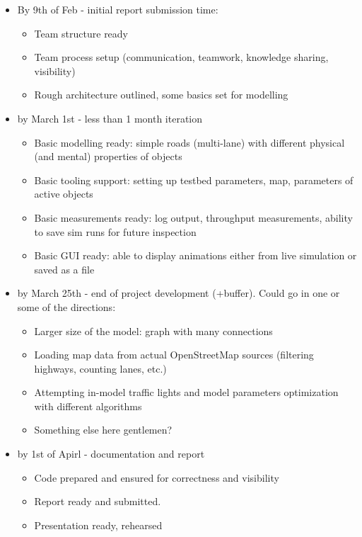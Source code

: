 \begin{itemize}
\begin{itemize}
	    \item By 9th of Feb - initial report submission time:
	    \begin{itemize}
	        \item Team structure ready
	        \item Team process setup (communication, teamwork, knowledge sharing, visibility)
	        \item Rough architecture outlined, some basics set for modelling
	    \end{itemize}

	    \item by March 1st - less than 1 month iteration
	    \begin{itemize}
	        \item Basic modelling ready: simple roads (multi-lane) with different physical (and mental) properties of objects
	        \item Basic tooling support: setting up testbed parameters, map, parameters of active objects
	        \item Basic measurements ready: log output, throughput measurements, ability to save sim runs for future inspection
	        \item Basic GUI ready: able to display animations either from live simulation or saved as a file
	    \end{itemize}

	    \item by March 25th - end of project development (+buffer). Could go in one or some of the directions:
	    \begin{itemize}
	        \item Larger size of the model: graph with many connections
	        \item Loading map data from actual OpenStreetMap sources (filtering highways, counting lanes, etc.)
	        \item Attempting in-model traffic lights and model parameters optimization with different algorithms
	        \item Something else here gentlemen?
	    \end{itemize}

	    \item by 1st of Apirl - documentation and report
	    \begin{itemize}
	        \item Code prepared and ensured for correctness and visibility
	        \item Report ready and submitted.
	        \item Presentation ready, rehearsed
	    \end{itemize}


\end{itemize}
\end{itemize}
